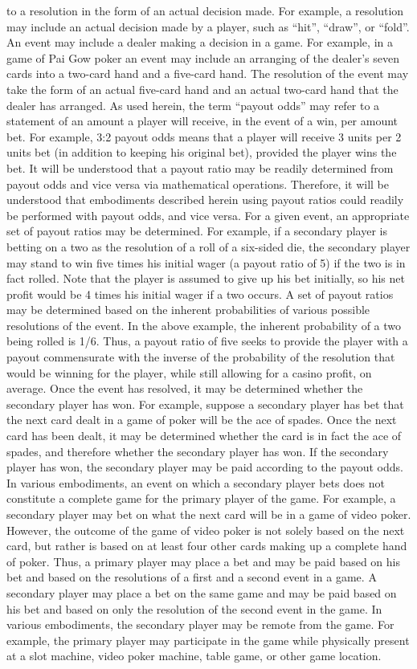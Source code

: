 \documentclass[11pt,a4paper]{article}
\begin{document}
to a resolution in the form of an actual decision made. For example, a resolution may include an actual decision made by a player, such as “hit”, “draw”, or “fold”. An event may include a dealer making a decision in a game. For example, in a game of Pai Gow poker an event may include an arranging of the dealer's seven cards into a two-card hand and a five-card hand. The resolution of the event may take the form of an actual five-card hand and an actual two-card hand that the dealer has arranged. As used herein, the term “payout odds” may refer to a statement of an amount a player will receive, in the event of a win, per amount bet. For example, 3:2 payout odds means that a player will receive 3 units per 2 units bet (in addition to keeping his original bet), provided the player wins the bet. It will be understood that a payout ratio may be readily determined from payout odds and vice versa via mathematical operations. Therefore, it will be understood that embodiments described herein using payout ratios could readily be performed with payout odds, and vice versa. For a given event, an appropriate set of payout ratios may be determined. For example, if a secondary player is betting on a two as the resolution of a roll of a six-sided die, the secondary player may stand to win five times his initial wager (a payout ratio of 5) if the two is in fact rolled. Note that the player is assumed to give up his bet initially, so his net profit would be 4 times his initial wager if a two occurs. A set of payout ratios may be determined based on the inherent probabilities of various possible resolutions of the event. In the above example, the inherent probability of a two being rolled is 1/6. Thus, a payout ratio of five seeks to provide the player with a payout commensurate with the inverse of the probability of the resolution that would be winning for the player, while still allowing for a casino profit, on average. Once the event has resolved, it may be determined whether the secondary player has won. For example, suppose a secondary player has bet that the next card dealt in a game of poker will be the ace of spades. Once the next card has been dealt, it may be determined whether the card is in fact the ace of spades, and therefore whether the secondary player has won. If the secondary player has won, the secondary player may be paid according to the payout odds. In various embodiments, an event on which a secondary player bets does not constitute a complete game for the primary player of the game. For example, a secondary player may bet on what the next card will be in a game of video poker. However, the outcome of the game of video poker is not solely based on the next card, but rather is based on at least four other cards making up a complete hand of poker. Thus, a primary player may place a bet and may be paid based on his bet and based on the resolutions of a first and a second event in a game. A secondary player may place a bet on the same game and may be paid based on his bet and based on only the resolution of the second event in the game. In various embodiments, the secondary player may be remote from the game. For example, the primary player may participate in the game while physically present at a slot machine, video poker machine, table game, or other game location. 
\end{document}

